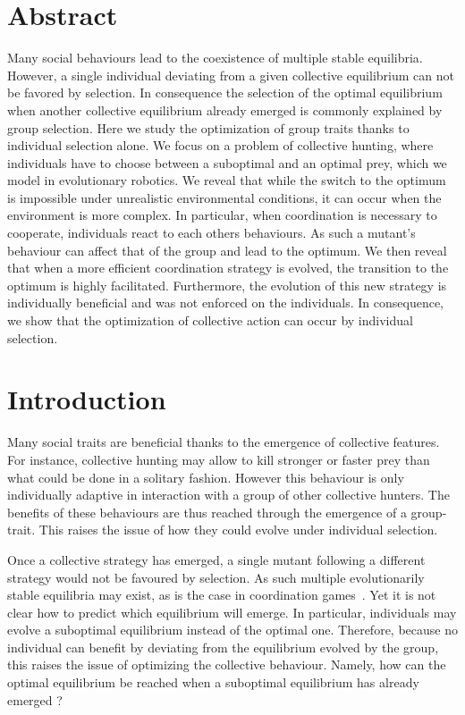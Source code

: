 \section{Abstract}
  Many social behaviours lead to the coexistence of multiple stable equilibria. However, a single individual deviating from a given collective equilibrium can not be favored by selection. In consequence the selection of the optimal equilibrium when another collective equilibrium already emerged is commonly explained by group selection. Here we study the optimization of group traits thanks to individual selection alone. We focus on a problem of collective hunting, where individuals have to choose between a suboptimal and an optimal prey, which we model in evolutionary robotics. We reveal that while the switch to the optimum is impossible under unrealistic environmental conditions, it can occur when the environment is more complex. In particular, when coordination is necessary to cooperate, individuals react to each others behaviours. As such a mutant's behaviour can affect that of the group and lead to the optimum. We then reveal that when a more efficient coordination strategy is evolved, the transition to the optimum is highly facilitated. Furthermore, the evolution of this new strategy is individually beneficial and was not enforced on the individuals. In consequence, we show that  the optimization of collective action can occur by individual selection.


\section{Introduction}
Many social traits are beneficial thanks to the emergence of collective features. For instance, collective hunting may allow to kill stronger or faster prey than what could be done in a solitary fashion. However this behaviour is only individually adaptive in interaction with a group of other collective hunters. The benefits of these behaviours are thus reached through the emergence of a group-trait. This raises the issue of how they could evolve under individual selection.

Once a collective strategy has emerged, a single mutant following a different strategy would not be favoured by selection. As such multiple evolutionarily stable equilibria may exist, as is the case in coordination games~\citep{MaynardSmith1982a, Skyrms2004}. Yet it is not clear how to predict which equilibrium will emerge. In particular, individuals may evolve a suboptimal equilibrium instead of the optimal one. Therefore, because no individual can benefit by deviating from the equilibrium evolved by the group, this raises the issue of optimizing the collective behaviour. Namely, how can the optimal equilibrium be reached when a suboptimal equilibrium has already emerged ?

